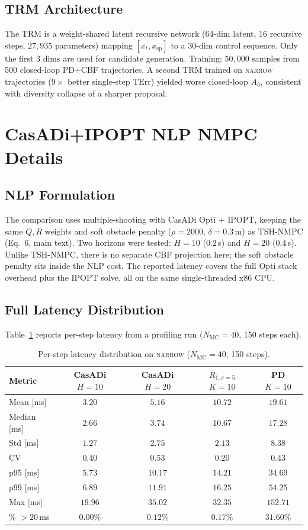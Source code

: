 \documentclass[11pt,a4paper]{article}
\newcommand{\Nm}{N_{\mathrm{MC}}}
\newcommand{\spt}{\mathrm{sp}}
\newcommand{\TErr}{\mathrm{TErr}}
\begin{document}
\subsection{TRM Architecture}
The TRM is a weight-shared latent recursive network (64-dim latent,
16 recursive steps, $27{,}935$ parameters) mapping $[x_t, x_\spt]$ to
a 30-dim control sequence. Only the first 3 dims are used for
candidate generation. Training: $50{,}000$ samples from 500
closed-loop PD+CBF trajectories. A second TRM trained on
\textsc{narrow} trajectories ($9\times$ better single-step $\TErr$)
yielded worse closed-loop $A_3$, consistent with diversity collapse
of a sharper proposal.

\section{CasADi+IPOPT NLP NMPC Details}
\label{sec:S4}

\subsection{NLP Formulation}
The comparison uses multiple-shooting with CasADi Opti + IPOPT, keeping
the same $Q, R$ weights and soft obstacle penalty ($\rho = 2000$,
$\delta = 0.3$\,m) as TSH-NMPC (Eq.~6, main text). Two horizons were
tested: $H = 10$ ($0.2$\,s) and $H = 20$ ($0.4$\,s). Unlike
TSH-NMPC, there is no separate CBF projection here; the soft obstacle
penalty sits inside the NLP cost. The reported latency covers the full
Opti stack overhead plus the IPOPT solve, all on the same
single-threaded x86 CPU.

\subsection{Full Latency Distribution}
Table~\ref{tab:s4-latency} reports per-step latency from a profiling
run ($\Nm = 40$, 150 steps each).
\begin{table}[h]
\centering
\caption{Per-step latency distribution on \textsc{narrow}
($\Nm = 40$, 150 steps).}\label{tab:s4-latency}
\begin{tabular}{lcccc}
\toprule
Metric & CasADi $H{=}10$ & CasADi $H{=}20$ & $R_{1,\sigma=5}$ $K{=}10$ & PD $K{=}10$ \\
\midrule
Mean [ms] & $3.20$ & $5.16$ & $10.72$ & $19.61$ \\
Median [ms] & $2.66$ & $3.74$ & $10.67$ & $17.28$ \\
Std [ms] & $1.27$ & $2.75$ & $2.13$ & $8.38$ \\
CV & $0.40$ & $0.53$ & $0.20$ & $0.43$ \\
p95 [ms] & $5.73$ & $10.17$ & $14.21$ & $34.69$ \\
p99 [ms] & $6.89$ & $11.91$ & $16.25$ & $54.25$ \\
Max [ms] & $19.96$ & $35.02$ & $32.35$ & $152.71$ \\
\% $>20$\,ms & $0.00\%$ & $0.12\%$ & $0.17\%$ & $31.60\%$ \\
\bottomrule
\end{tabular}
\end{table}
\end{document}
